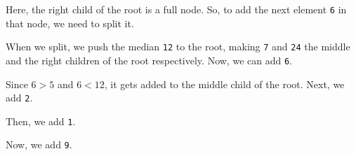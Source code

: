 \documentclass[a4paper, openany]{memoir}
\begin{document}
Here, the right child of the root is a full node. So, to add the next element \texttt{6} in that node, we need to split it.
\begin{center}
\end{center}
When we split, we push the median \texttt{12} to the root, making \texttt{7} and \texttt{24} the middle and the right children of the root respectively. Now, we can add \texttt{6}.
\begin{center}
\end{center}
Since $6 > 5$ and $6 < 12$, it gets added to the middle child of the root. Next, we add \texttt{2}.
\begin{center}
\end{center}
Then, we add \texttt{1}.
\begin{center}
\end{center}
Now, we add \texttt{9}.
\begin{center}
\end{center}
\end{document}
